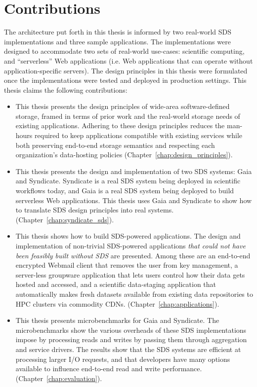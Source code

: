 \section{Contributions}

The architecture put forth in this thesis is informed by two real-world SDS
implementations and three sample applications.  The implementations were 
designed to accommodate two sets of real-world use-cases: scientific computing,
and ``serverless'' Web applications (i.e. Web applications that can operate
without application-specific servers).
The design principles in this thesis 
were formulated once the implementations were tested and
deployed in production settings.  This thesis claims the following contributions:

\begin{itemize}

\item This thesis presents the design principles of wide-area software-defined storage, framed in
terms of prior work and the real-world storage needs of existing applications.
Adhering to these design principles reduces the man-hours required to keep applications compatible
with existing services while both preserving end-to-end storage semantics and
respecting each organization's data-hosting policies (Chapter~\ref{chap:design_principles}).

\item This thesis presents the design and implementation of two SDS systems: Gaia and
Syndicate.  Syndicate is a real SDS system being deployed in scientific
workflows today, and Gaia is a real SDS system being deployed to build
serverless Web applications.
This thesis uses Gaia and Syndicate to show how to translate SDS design
principles into real systems.
(Chapter~\ref{chap:syndicate_sds}).

\item This thesis shows how to build SDS-powered applications.  The design and
implementation of non-trivial SDS-powered applications \emph{that could not
have been feasibly built without SDS} are presented.  Among these are an end-to-end encrypted
Webmail client that removes the user from key management, a server-less
groupware application that lets users control how their data gets hosted and
accessed, and a scientific data-staging application that
automatically makes fresh datasets available from existing data repositories to
HPC clusters via commodity CDNs.
(Chapter~\ref{chap:applications}).

\item This thesis presents microbenchmarks for Gaia and Syndicate.  The
microbenchmarks show the various overheads of these SDS implementations
impose by processing reads and writes by passing them through aggregation
and service drivers.  The results show that the SDS
systems are efficient at processing larger I/O requests, and that developers
have many options available to influence end-to-end read and write performance.
(Chapter~\ref{chap:evaluation}).

\end{itemize}

